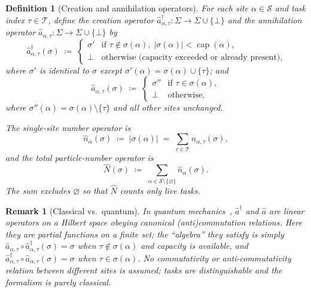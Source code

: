 \documentclass[11pt,a4paper]{report}
\newtheorem{definition}{Definition}[section]
\newtheorem{remark}{Remark}[section]
\newcommand{\cre}[1]{\hat{a}^{\dagger}_{#1}}
\newcommand{\ann}[1]{\hat{a}_{#1}}
\newcommand{\num}[1]{\hat{n}_{#1}}
\newcommand{\Num}{\hat{N}}
\begin{document}
\begin{definition}[Creation and annihilation operators]
\label{def:cre-ann}
For each site $\alpha \in \mathcal{S}$ and task index $\tau \in
\mathcal{T}$, define the \emph{creation operator}
$\cre{\alpha,\tau} : \Sigma \to \Sigma \cup \{\bot\}$ and the
\emph{annihilation operator} $\ann{\alpha,\tau} : \Sigma \to \Sigma
\cup \{\bot\}$ by
\[
  \cre{\alpha,\tau}(\sigma) \;\coloneqq\;
  \begin{cases}
    \sigma' & \text{if } \tau \notin \sigma(\alpha),\;
              |\sigma(\alpha)| < \operatorname{cap}(\alpha),\\
    \bot & \text{otherwise (capacity exceeded or already present)},
  \end{cases}
\]
where $\sigma'$ is identical to $\sigma$ except $\sigma'(\alpha) =
\sigma(\alpha) \cup \{\tau\}$; and
\[
  \ann{\alpha,\tau}(\sigma) \;\coloneqq\;
  \begin{cases}
    \sigma'' & \text{if } \tau \in \sigma(\alpha),\\
    \bot & \text{otherwise},
  \end{cases}
\]
where $\sigma''(\alpha) = \sigma(\alpha) \setminus \{\tau\}$ and all
other sites unchanged.

The \emph{single-site number operator} is
\[
  \num{\alpha}(\sigma) \;\coloneqq\; |\sigma(\alpha)|
  \;=\; \sum_{\tau \in \mathcal{T}} n_{\alpha,\tau}(\sigma),
\]
and the \emph{total particle-number operator} is
\[
  \Num(\sigma) \;\coloneqq\;
  \sum_{\alpha \in \mathcal{S} \setminus \{\varnothing\}} \num{\alpha}(\sigma).
\]
The sum excludes $\varnothing$ so that $\Num$ counts only
\emph{live} tasks.
\end{definition}

\begin{remark}[Classical vs.\ quantum]
In quantum mechanics~\cite{landau_qm,feynman_iii}, $\hat{a}^\dagger$ and $\hat{a}$ are linear
operators on a Hilbert space obeying canonical (anti)commutation
relations.  Here they are \emph{partial functions on a finite set};
the ``algebra'' they satisfy is simply
$\ann{\alpha,\tau} \circ \cre{\alpha,\tau}(\sigma) = \sigma$ when
$\tau \notin \sigma(\alpha)$ and capacity is available, and
$\cre{\alpha,\tau} \circ \ann{\alpha,\tau}(\sigma) = \sigma$ when
$\tau \in \sigma(\alpha)$.  No commutativity or anti-commutativity
relation between different sites is assumed; tasks are
distinguishable and the formalism is purely classical.
\end{remark}

\end{document}
